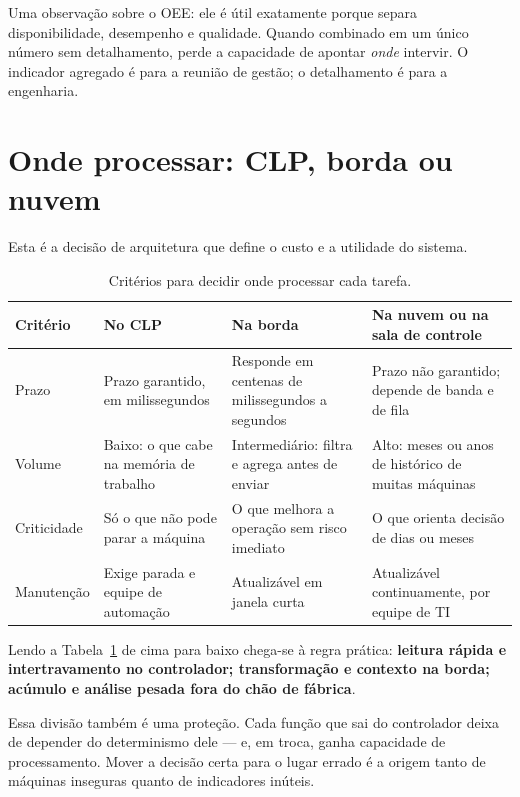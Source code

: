 Uma observação sobre o OEE: ele é útil exatamente porque separa disponibilidade, desempenho e
qualidade. Quando combinado em um único número sem detalhamento, perde a capacidade de apontar
\emph{onde} intervir. O indicador agregado é para a reunião de gestão; o detalhamento é para a
engenharia.

\section{Onde processar: CLP, borda ou nuvem}

Esta é a decisão de arquitetura que define o custo e a utilidade do sistema.

\begin{table}[H]
  \centering
  \caption{Critérios para decidir onde processar cada tarefa.}
  \label{tab:onde-processar}
  \begin{tabular}{p{2.4cm} p{3.3cm} p{3.3cm} p{5.3cm}}
    \toprule
    Critério & No CLP & Na borda & Na nuvem ou na sala de controle \\
    \midrule
    Prazo
      & Prazo garantido, em milissegundos
      & Responde em centenas de milissegundos a segundos
      & Prazo não garantido; depende de banda e de fila \\
    \addlinespace
    Volume
      & Baixo: o que cabe na memória de trabalho
      & Intermediário: filtra e agrega antes de enviar
      & Alto: meses ou anos de histórico de muitas máquinas \\
    \addlinespace
    Criticidade
      & Só o que não pode parar a máquina
      & O que melhora a operação sem risco imediato
      & O que orienta decisão de dias ou meses \\
    \addlinespace
    Manutenção
      & Exige parada e equipe de automação
      & Atualizável em janela curta
      & Atualizável continuamente, por equipe de TI \\
    \bottomrule
  \end{tabular}
\end{table}

Lendo a Tabela~\ref{tab:onde-processar} de cima para baixo chega-se à regra prática:
\textbf{leitura rápida e intertravamento no controlador; transformação e contexto na borda; acúmulo e
análise pesada fora do chão de fábrica}.

Essa divisão também é uma proteção. Cada função que sai do controlador deixa de depender do
determinismo dele --- e, em troca, ganha capacidade de processamento. Mover a decisão certa para o
lugar errado é a origem tanto de máquinas inseguras quanto de indicadores inúteis.

